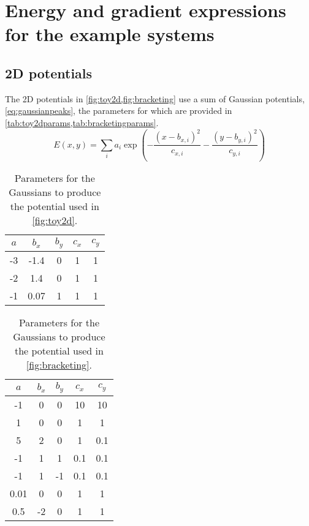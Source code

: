 \documentclass[aip,jcp,reprint,twocolumn]{revtex4-1}
\begin{document}
\section{Energy and gradient expressions for the example systems}
\subsection{2D potentials}\label{sec:2dpotentials}
The 2D potentials in \cref{fig:toy2d,fig:bracketing} use a sum of Gaussian potentials, \cref{eq:gaussianpeaks}, the parameters for which are provided in \cref{tab:toy2dparams,tab:bracketingparams}.
\begin{equation}
  E(x,y) = \sum_i a_i \exp\!\left( - \frac{(x-b_{x,i})^2}{c_{x,i}} - \frac{(y-b_{y,i})^2}{c_{y,i}} \right)
  \label{eq:gaussianpeaks}
\end{equation}

\begin{table}[ht]
  \begin{ruledtabular}
  \begin{tabular}{ccccc}
    $a$ & $b_x$ & $b_y$ & $c_x$ & $c_y$ \\
    \hline
    -3  & -1.4  &   0   &   1   &   1   \\
    -2  &  1.4  &   0   &   1   &   1   \\
    -1  &  0.07 &   1   &   1   &   1   \\
  \end{tabular}
  \end{ruledtabular}
  \caption{\label{tab:toy2dparams}
    Parameters for the Gaussians to produce the potential used in \cref{fig:toy2d}.
  }
\end{table}

\begin{table}[ht]
  \begin{ruledtabular}
  \begin{tabular}{ccccc}
    $a$  & $b_x$ & $b_y$ & $c_x$ & $c_y$ \\
    \hline
    -1   &   0   &   0   &  10   &  10   \\
     1   &   0   &   0   &   1   &   1   \\
     5   &   2   &   0   &   1   &  0.1  \\
    -1   &   1   &   1   &  0.1  &  0.1  \\
    -1   &   1   &  -1   &  0.1  &  0.1  \\
    0.01 &   0   &   0   &   1   &   1   \\
    0.5  &  -2   &   0   &   1   &   1   \\
  \end{tabular}
  \end{ruledtabular}
  \caption{\label{tab:bracketingparams}
    Parameters for the Gaussians to produce the potential used in \cref{fig:bracketing}.
  }
\end{table}
\end{document}
